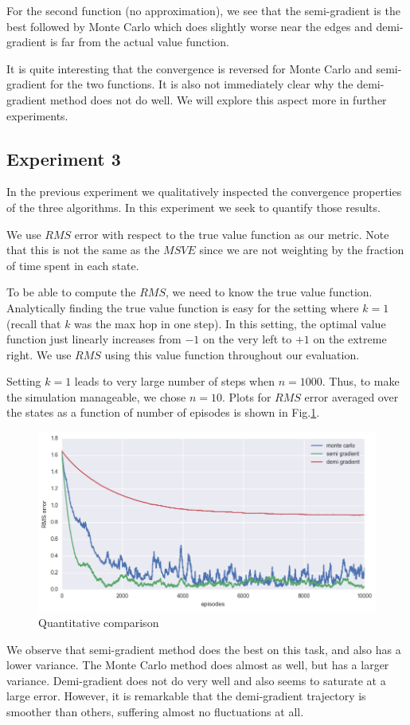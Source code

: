 \documentclass{article}
\begin{document}
    For the second function (no approximation), we see that the semi-gradient is the best followed by Monte Carlo which does slightly worse near the edges and demi-gradient is far from the actual value function.

    It is quite interesting that the convergence is reversed for Monte Carlo and semi-gradient for the two functions. It is also not immediately clear why the demi-gradient method does not do well. We will explore this aspect more in further experiments.

\subsection{Experiment 3}
    In the previous experiment we qualitatively inspected the convergence properties of the three algorithms. In this experiment we seek to quantify those results.

    We use $RMS$ error with respect to the true value function as our metric. Note that this is not the same as the $MSVE$ since we are not weighting by the fraction of time spent in each state.

    To be able to compute the $RMS$, we need to know the true value function. Analytically finding the true value function is easy for the setting where $k=1$ (recall that $k$ was the max hop in one step). In this setting, the optimal value function just linearly increases from $-1$ on the very left to $+1$ on the extreme right. We use $RMS$ using this value function throughout our evaluation.

    Setting $k=1$ leads to very large number of steps when $n = 1000$. Thus, to make the simulation manageable, we chose $n=10$. Plots for $RMS$ error averaged over the states as a function of number of episodes is shown in Fig.\ref{fig:qc1}.
    \begin{figure}
        \centering
        \includegraphics[width=\textwidth]{quant_comp}
        \caption{Quantitative comparison}\label{fig:qc1}
    \end{figure}
    We observe that semi-gradient method does the best on this task, and also has a lower variance. The Monte Carlo method does almost as well, but has a larger variance. Demi-gradient does not do very well and also seems to saturate at a large error. However, it is remarkable that the demi-gradient trajectory is smoother than others, suffering almost no fluctuations at all.
\end{document}
